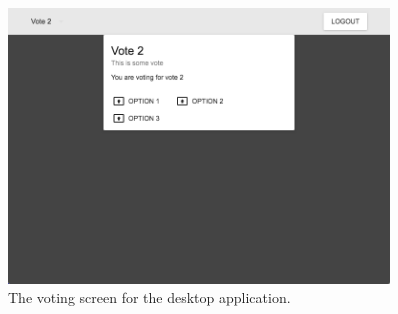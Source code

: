 \documentclass{article}
\begin{document}
\begin{centering}
    \begin{figure}[H]
        \centering
        \includegraphics[width=0.9\textwidth]{screenshots/screen-vote-voting}
        \caption{The voting screen for the desktop application.}
        \label{fig:registration}
    \end{figure}
\end{centering}

\newpage
\printbibliography[heading=bibintoc]
\end{document}
